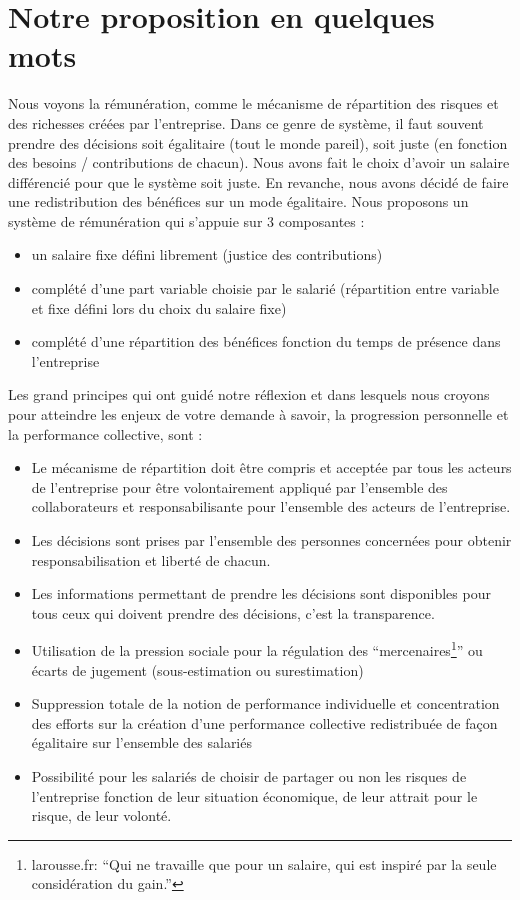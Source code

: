 \documentclass[12pt]{article}
\begin{document}
\section{Notre proposition en quelques mots}
 Nous voyons la rémunération, comme le mécanisme de répartition des risques et des richesses créées par l’entreprise. Dans ce genre de système, il faut souvent prendre des décisions soit égalitaire (tout le monde pareil), soit juste (en fonction des besoins / contributions de chacun). Nous avons fait le choix d’avoir un salaire différencié pour que le système soit juste. En revanche, nous avons décidé de faire une redistribution des bénéfices sur un mode égalitaire. 
 Nous proposons un système de rémunération qui s’appuie sur 3 composantes :
 \begin{itemize}
   \item un salaire fixe défini librement (justice des contributions) 
   \item complété d’une part variable choisie par le salarié (répartition entre variable et fixe défini lors du choix du salaire fixe)
   \item complété d’une répartition des bénéfices fonction du temps de présence dans l’entreprise
 \end{itemize}

 Les grand principes qui ont guidé notre réflexion et dans lesquels nous croyons pour atteindre les enjeux de votre demande à savoir, la progression personnelle et la performance collective, sont :
 \begin{itemize}
   \item Le mécanisme de répartition doit être compris et acceptée par tous les acteurs de l’entreprise pour être volontairement appliqué par l’ensemble des collaborateurs et responsabilisante pour l’ensemble des acteurs de l’entreprise.
   \item Les décisions sont prises par l’ensemble des personnes concernées pour obtenir responsabilisation et liberté de chacun. 
   \item Les informations permettant de prendre les décisions sont disponibles pour tous ceux qui doivent prendre des décisions, c’est la transparence.
   \item Utilisation de la pression sociale pour la régulation des “mercenaires\footnote{larousse.fr: “Qui ne travaille que pour un salaire, qui est inspiré par la seule considération du gain.”}” ou écarts de jugement (sous-estimation ou surestimation)
   \item Suppression totale de la notion de performance individuelle et concentration des efforts sur la création d'une performance collective redistribuée de façon égalitaire sur l'ensemble des salariés 
   \item Possibilité pour les salariés de choisir de partager ou non les risques de l'entreprise fonction de leur situation économique, de leur attrait pour le risque, de leur volonté.
 \end{itemize}
\end{document}

